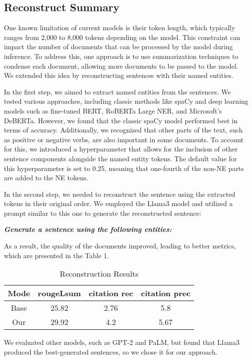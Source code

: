 \subsection{Reconstruct Summary}
One known limitation of current models is their token length, which typically ranges from 2,000 to 8,000 tokens depending on the model. This constraint can impact the number of documents that can be processed by the model during inference. To address this, one approach is to use summarization techniques to condense each document, allowing more documents to be passed to the model. We extended this idea by reconstructing sentences with their named entities.

In the first step, we aimed to extract named entities from the sentences. We tested various approaches, including classic methods like spaCy and deep learning models such as fine-tuned BERT, RoBERTa Large NER, and Microsoft's DeBERTa. However, we found that the classic spaCy model performed best in terms of accuracy. Additionally, we recognized that other parts of the text, such as positive or negative verbs, are also important in some documents. To account for this, we introduced a hyperparameter that allows for the inclusion of other sentence components alongside the named entity tokens. The default value for this hyperparameter is set to 0.25, meaning that one-fourth of the non-NE parts are added to the NE tokens.

In the second step, we needed to reconstruct the sentence using the extracted tokens in their original order. We employed the Llama3 model and utilized a prompt similar to this one to generate the reconstructed sentence:

\begin{center}
\textbf{\textit{Generate a sentence using the following entities:}}
\end{center}

As a result, the quality of the documents improved, leading to better metrics, which are presented in the Table 1.

\begin{table}[]
  \centering
  \begin{tabular}{@{}cccc@{}}
    \toprule
    Mode  & rougeLsum    & citation rec & citation prec \\
    \midrule
    Base & 25.82 & 2.76 & 5.8 \\
    Our & 29.92 & 4.2 & 5.67 \\
    \bottomrule
  \end{tabular}
  \caption{Reconstruction Results}
\end{table}

We evaluated other models, such as GPT-2 and PaLM, but found that Llama3 produced the best-generated sentences, so we chose it for our approach.
